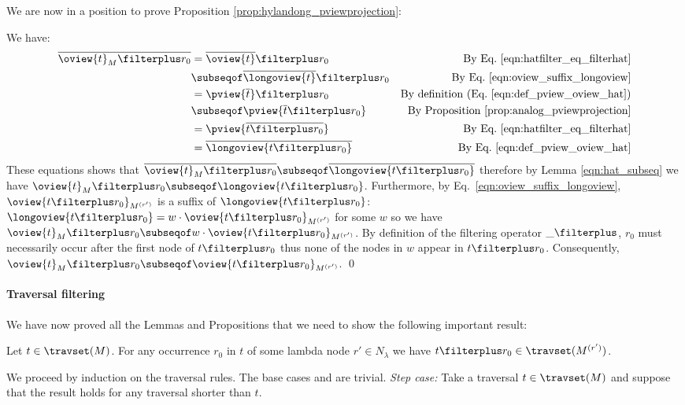 We are now in a position to prove Proposition
\ref{prop:hylandong_pviewprojection}:


We have:
\begin{align*}
  \overline{\oview{t}_M\filterplus r_0}
        &= \overline{\oview{t}} \filterplus r_0 & \mbox{By Eq.\ \ref{eqn:hatfilter_eq_filterhat}} \\
        &\subseqof \overline{\longoview{t}} \filterplus r_0 & \mbox{By Eq.\ \ref{eqn:oview_suffix_longoview}} \\
        &= \pview{\overline{t}} \filterplus r_0 & \mbox{By definition (Eq.\ \ref{eqn:def_pview_oview_hat})} \\
        &\subseqof \pview{\overline{t} \filterplus r_0}  & \mbox{By Proposition \ref{prop:analog_pviewprojection}} \\
        &= \pview{\overline{t \filterplus r_0}}  & \mbox{By Eq.\ \ref{eqn:hatfilter_eq_filterhat}} \\
        &= \overline{\longoview{t \filterplus r_0}}  & \mbox{By Eq.\ \ref{eqn:def_pview_oview_hat}}
\end{align*}
These equations shows that $\overline{\oview{t}_M\filterplus r_0} \subseqof
\overline{\longoview{t \filterplus r_0}}$ therefore by Lemma
\ref{eqn:hat_subseq} we have $\oview{t}_M\filterplus r_0 \subseqof
\longoview{t \filterplus r_0}$. Furthermore, by Eq.\
\ref{eqn:oview_suffix_longoview}, $\oview{t \filterplus
r_0}_{M^{(r')}}$ is a suffix of $\longoview{t \filterplus r_0}$:
$\longoview{t \filterplus r_0} = w \cdot \oview{t \filterplus
r_0}_{M^{(r')}}$ for some $w$ so we have $\oview{t}_M\filterplus r_0
\subseqof w \cdot \oview{t \filterplus r_0}_{M^{(r')}}$. By definition of the filtering operator $\_ \filterplus$, $r_0$ must
necessarily occur after the first node of $t \filterplus r_0$ thus
none of the nodes in $w$ appear in $t\filterplus r_0$. Consequently,
$\oview{t}_M\filterplus r_0 \subseqof \oview{t \filterplus
r_0}_{M^{(r')}}$. \qed

\paragraph{Traversal filtering}
We have now proved all the Lemmas and Propositions that we need to show the following important result:
\begin{proposition}
    \label{prop:trav_filtering}
    Let $t \in \travset(M)$. For any occurrence $r_0$ in $t$ of some lambda node
    $r'\in N_\lambda$ we have $t\filterplus r_0 \in \travset(M^{(r')})$.
\end{proposition}
\proof
    We proceed by induction on the traversal rules. The base cases  and
    \rulenamet{Root} are trivial. \emph{Step case:} Take a traversal $t \in \travset(M)$ and suppose that the result holds for any traversal shorter than $t$.

